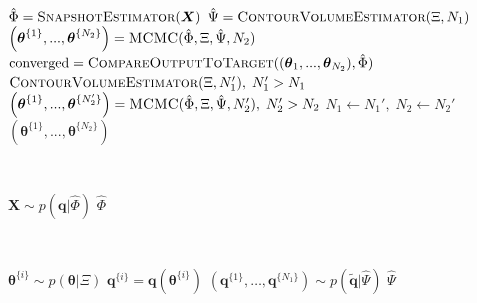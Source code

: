 \begin{algorithm}[H]
\footnotesize
\texttt{\\}
\begin{algorithmic}
	\State $\hat{\Phi} = \Call{SnapshotEstimator}{\boldsymbol{X}}$
	\State $\hat{\Psi} = \Call{ContourVolumeEstimator}{\Xi,N_1}$
	\State $\left(\boldsymbol{\theta}^{\{1\}},...,\boldsymbol{\theta}^{\{N_2\}}\right) = \Call{MCMC}{\hat{\Phi},\Xi, \hat{\Psi},N_2}$
	\State $\text{converged} = \Call{CompareOutputToTarget}{(\boldsymbol{\theta}_1,...,\boldsymbol{\theta}_{N_2}), \hat{\Phi}}$
	 
		 \State $\Call{ContourVolumeEstimator}{\Xi, N_1'},\; N_1' > N_1$
         \State $\left( \boldsymbol{\theta}^{\{1\}},...,\boldsymbol{\theta}^{\{N_2'\}} \right)
                = \Call{MCMC}{\hat{\Phi},\Xi, \hat{\Psi},N_2'}, \; N_2' > N_2$
         \State $N_1 \leftarrow N_1', \; N_2 \leftarrow N_2'$
	\EndIf
	\State \Return $\left( \boldsymbol{\theta}^{\{1\}},...,\boldsymbol{\theta}^{\{N_2\}} \right)$
\EndProcedure
\end{algorithmic}

\texttt{\\}
\begin{algorithmic}
	\State $\boldsymbol{X} \sim p(\boldsymbol{q}|\hat{\Phi})$
	\State \Return $\hat{\Phi}$
\EndProcedure
\end{algorithmic}
	
\texttt{\\}
\begin{algorithmic}
		\State $\boldsymbol{\theta}^{\{i\}} \sim p(\boldsymbol{\theta}|\Xi)$           
		\State $\boldsymbol{q}^{\{i\}} = \boldsymbol{q}(\boldsymbol{\theta}^{\{i\}})$  
	\EndFor
	\State $\left( \boldsymbol{q}^{\{1\}}, \dots ,\boldsymbol{q}^{\{N_1\}} \right) \sim p(\tilde{\boldsymbol{q}}|\hat{\Psi})$
	\State \Return $\hat{\Psi}$
\EndProcedure
\end{algorithmic}


\end{algorithm}
